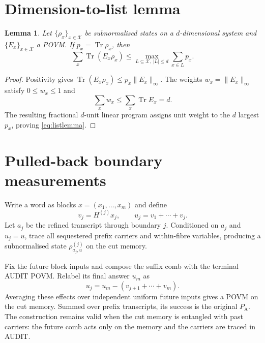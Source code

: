 \documentclass[10pt,twocolumn]{article}
\newtheorem{lemma}[theorem]{Lemma}
\theoremstyle{remark}
\newcommand{\Tr}{\operatorname{Tr}}
\newcommand{\PA}{P_{\mathrm A}}
\begin{document}
\appendix
\section{Dimension-to-list lemma}
\label{app:list}

\begin{lemma}
Let $\{\rho_x\}_{x\in\mathcal X}$ be subnormalised states on a
$d$-dimensional system and $\{E_x\}_{x\in\mathcal X}$ a POVM. If
$p_x=\Tr\rho_x$, then
\begin{equation}
\sum_x\Tr(E_x\rho_x)
\leq\max_{L\subseteq\mathcal X,\,|L|\leq d}\sum_{x\in L}p_x.
\label{eq:listlemma}
\end{equation}
\end{lemma}

\begin{proof}
Positivity gives
$\Tr(E_x\rho_x)\leq p_x\lVert E_x\rVert_\infty$. The weights
$w_x=\lVert E_x\rVert_\infty$ satisfy $0\leq w_x\leq1$ and
\begin{equation}
\sum_xw_x\leq\sum_x\Tr E_x=d.
\end{equation}
The resulting fractional $d$-unit linear program assigns unit weight to the
$d$ largest $p_x$, proving \eqref{eq:listlemma}.
\end{proof}

\section{Pulled-back boundary measurements}
\label{app:pullback}

Write a word as blocks $x=(x_1,\ldots,x_m)$ and define
\begin{equation}
v_j=H^{(j)}x_j,\qquad u_j=v_1+\cdots+v_j.
\end{equation}
Let $a_j$ be the refined transcript through boundary $j$. Conditioned on
$a_j$ and $u_j=u$, trace all sequestered prefix carriers and within-fibre
variables, producing a subnormalised state $\rho^{(j)}_{a_j,u}$ on the cut
memory.

Fix the future block inputs and compose the suffix comb with the terminal
AUDIT POVM. Relabel its final answer $u_m$ as
\begin{equation}
u_j=u_m-(v_{j+1}+\cdots+v_m).
\end{equation}
Averaging these effects over independent uniform future inputs gives a POVM
on the cut memory. Summed over prefix transcripts, its success is the original
$\PA$. The construction remains valid when the cut memory is entangled with
past carriers: the future comb acts only on the memory and the carriers are
traced in AUDIT.
\end{document}
